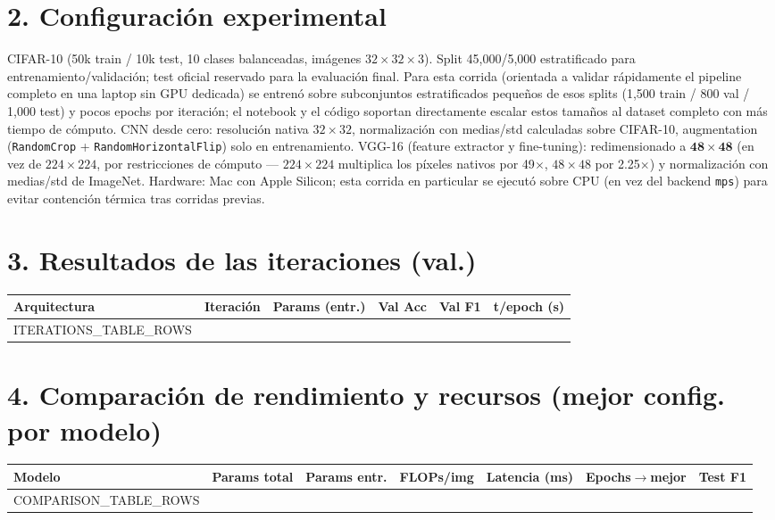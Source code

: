 \documentclass[9pt]{article}
\begin{document}
\section*{2. Configuración experimental}
\footnotesize
CIFAR-10 (50k train / 10k test, 10 clases balanceadas, imágenes $32\times32\times3$). Split
45{,}000/5{,}000 estratificado para entrenamiento/validación; test oficial reservado para la
evaluación final. Para esta corrida (orientada a validar rápidamente el pipeline completo en una
laptop sin GPU dedicada) se entrenó sobre subconjuntos estratificados pequeños de esos splits
(1{,}500 train / 800 val / 1{,}000 test) y pocos epochs por iteración; el notebook y el código
soportan directamente escalar estos tamaños al dataset completo con más tiempo de cómputo. CNN
desde cero: resolución nativa $32\times32$, normalización con medias/std calculadas sobre
CIFAR-10, augmentation (\texttt{RandomCrop} + \texttt{RandomHorizontalFlip}) solo en entrenamiento.
VGG-16 (feature extractor y fine-tuning): redimensionado a $\mathbf{48\times48}$ (en vez de
$224\times224$, por restricciones de cómputo --- $224\times224$ multiplica los píxeles nativos por
49$\times$, $48\times48$ por 2.25$\times$) y normalización con medias/std de ImageNet. Hardware:
Mac con Apple Silicon; esta corrida en particular se ejecutó sobre CPU (en vez del backend
\texttt{mps}) para evitar contención térmica tras corridas previas.

\section*{3. Resultados de las iteraciones (val.)}
\scriptsize
\begin{center}
\begin{tabular}{p{2.6cm}p{4.6cm}rrrr}
\toprule
\textbf{Arquitectura} & \textbf{Iteración} & \textbf{Params (entr.)} & \textbf{Val Acc} & \textbf{Val F1} & \textbf{t/epoch (s)} \\
\midrule
ITERATIONS_TABLE_ROWS
\bottomrule
\end{tabular}
\end{center}

\section*{4. Comparación de rendimiento y recursos (mejor config. por modelo)}
\scriptsize
\begin{center}
\begin{tabular}{p{2.9cm}rrrrrr}
\toprule
\textbf{Modelo} & \textbf{Params total} & \textbf{Params entr.} & \textbf{FLOPs/img} & \textbf{Latencia (ms)} & \textbf{Epochs$\to$mejor} & \textbf{Test F1} \\
\midrule
COMPARISON_TABLE_ROWS
\bottomrule
\end{tabular}
\end{center}
\end{document}
